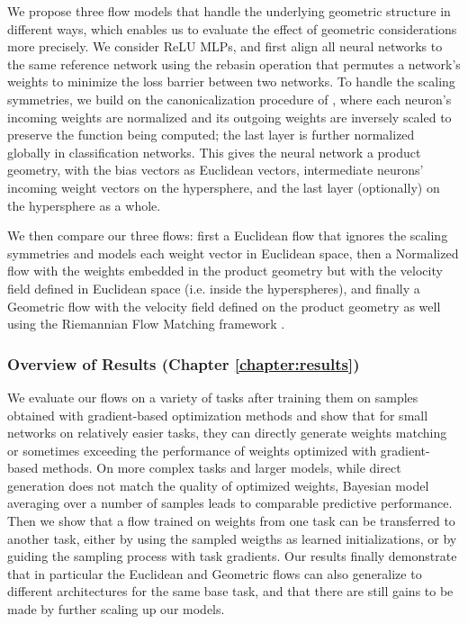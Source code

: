 We propose three flow models that handle the underlying geometric structure in different ways, which enables us to evaluate the effect of geometric considerations more precisely. We consider ReLU MLPs, and first align all neural networks to the same reference network using the rebasin operation \citep{ainsworthGitReBasinMerging2023,penaReBasinImplicitSinkhorn2023} that permutes a network's weights to minimize the loss barrier between two networks.  To handle the scaling symmetries, we build on the canonicalization procedure of \citep{pittorinoDeepNetworksToroids2022}, where each neuron's incoming weights are normalized and its outgoing weights are inversely scaled to preserve the function being computed; the last layer is further normalized globally in classification networks. This gives the neural network a product geometry, with the bias vectors as Euclidean vectors, intermediate neurons' incoming weight vectors on the hypersphere, and the last layer (optionally) on the hypersphere as a whole. 

We then compare our three flows: first a Euclidean flow that ignores the scaling symmetries and models each weight vector in Euclidean space, then a Normalized flow with the weights embedded in the product geometry but with the velocity field defined in Euclidean space (i.e. inside the hyperspheres), and finally a Geometric flow with the velocity field defined on the product geometry as well using the Riemannian Flow Matching framework \citep{chenRiemannianFlowMatching2023}. 

\subsubsection{Overview of Results (Chapter \ref{chapter:results})}

We evaluate our flows on a variety of tasks after training them on samples obtained with gradient-based optimization methods and show that for small networks on relatively easier tasks, they can directly generate weights matching or sometimes exceeding the performance of weights optimized with gradient-based methods. On more complex tasks and larger models, while direct generation does not match the quality of optimized weights, Bayesian model averaging over a number of samples leads to comparable predictive performance. Then we show that a flow trained on weights from one task can be transferred to another task, either by using the sampled weigths as learned initializations, or by guiding the sampling process with task gradients. Our results finally demonstrate that in particular the Euclidean and Geometric flows can also generalize to different architectures for the same base task, and that there are still gains to be made by further scaling up our models. 